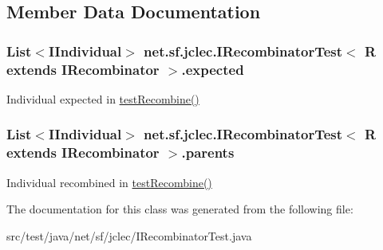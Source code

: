 \subsection{Member Data Documentation}
\hypertarget{classnet_1_1sf_1_1jclec_1_1_i_recombinator_test_3_01_r_01extends_01_i_recombinator_01_4_adfca5e9d22442fb97fd88d93cabb8412}{
\subsubsection[{expected}]{\setlength{\rightskip}{0pt plus 5cm}List$<${\bf I\-Individual}$>$ net.\-sf.\-jclec.\-I\-Recombinator\-Test$<$ R extends {\bf I\-Recombinator} $>$.expected\hspace{0.3cm}{\ttfamily [protected]}}}\label{classnet_1_1sf_1_1jclec_1_1_i_recombinator_test_3_01_r_01extends_01_i_recombinator_01_4_adfca5e9d22442fb97fd88d93cabb8412}
Individual expected in \hyperlink{classnet_1_1sf_1_1jclec_1_1_i_recombinator_test_3_01_r_01extends_01_i_recombinator_01_4_a3cdc4f9a3e51a71344bfcfa2772150e1}{test\-Recombine()} \hypertarget{classnet_1_1sf_1_1jclec_1_1_i_recombinator_test_3_01_r_01extends_01_i_recombinator_01_4_a2c882a7f4b6490685308c41512a1d2e5}{
\subsubsection[{parents}]{\setlength{\rightskip}{0pt plus 5cm}List$<${\bf I\-Individual}$>$ net.\-sf.\-jclec.\-I\-Recombinator\-Test$<$ R extends {\bf I\-Recombinator} $>$.parents\hspace{0.3cm}{\ttfamily [protected]}}}\label{classnet_1_1sf_1_1jclec_1_1_i_recombinator_test_3_01_r_01extends_01_i_recombinator_01_4_a2c882a7f4b6490685308c41512a1d2e5}
Individual recombined in \hyperlink{classnet_1_1sf_1_1jclec_1_1_i_recombinator_test_3_01_r_01extends_01_i_recombinator_01_4_a3cdc4f9a3e51a71344bfcfa2772150e1}{test\-Recombine()} 

The documentation for this class was generated from the following file\-:\begin{DoxyCompactItemize}
\item 
src/test/java/net/sf/jclec/I\-Recombinator\-Test.\-java\end{DoxyCompactItemize}
